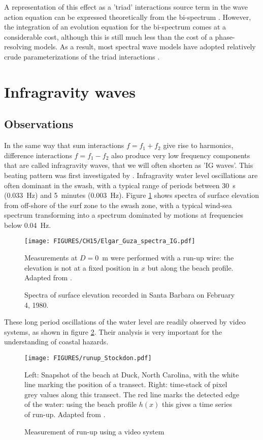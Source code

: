 A representation of this 
effect as a  'triad' interactions  source term  in the wave action equation can be expressed theoretically 
from the bi-spectrum \citep{Herbers&Burton1997,Becq1998}. However, the integration of an evolution equation 
for the bi-spectrum comes at a considerable cost, although this is still much less than the cost of a phase-resolving models. 
As a result, most spectral wave models have adopted relatively crude parameterizations of the triad interactions
\citep[e.g.][]{Eldeberky&Battjes1995}. 


\section{Infragravity waves}\label{sec:IG}
\subsection{Observations}
 In the same way that sum interactions $f=f_1 + f_2$  give rise to harmonics, difference interactions 
 $f=f_1 - f_2$ also produce very low frequency components that are called infragravity waves, that we will often shorten as 'IG waves'. 
 This beating pattern was first 
 investigated by \cite{Munk1949}. Infragravity water level oscillations are often dominant in the swash, with a typical range of periods
 between 30~s (0.033~Hz) and 5~minutes (0.003~Hz). Figure \ref{fig:NSTS_IG} shows spectra of surface elevation from off-shore of the surf zone 
 to the swash zone, with a typical wind-sea spectrum transforming into a spectrum dominated by motions at frequencies below 0.04~Hz.
\begin{figure}[htb]
\centerline{\texttt{[image: FIGURES/CH15/Elgar\_Guza\_spectra\_IG.pdf]}}
  \caption{Spectra of surface elevation recorded in Santa Barbara on February 4, 1980.}
    {Measurements at $D=0$~m were performed with a run-up wire: the elevation is not at a fixed position in $x$ but along the beach profile. Adapted 
    from \cite{Elgar&Guza1985b}.}
\label{fig:NSTS_IG}
\end{figure}
These long period oscillations of the water level are readily observed by video systems, as shown in figure \ref{fig:video_runup}. Their analysis 
is very important for the understanding of coastal hazards. 
\begin{figure}[htb]
\centerline{\texttt{[image: FIGURES/runup\_Stockdon.pdf]}}
  \caption{Measurement of run-up using a video system}
    {Left: Snapshot of the beach at Duck, North Carolina, with the white line marking the position of a transect. Right: 
    time-stack of pixel grey values along this transect. The red line marks the detected edge of the water: using the beach profile $h(x)$ this 
    gives a time series of run-up. Adapted 
    from \cite{Stockdon&al.2006}.}
\label{fig:video_runup}
\end{figure}

